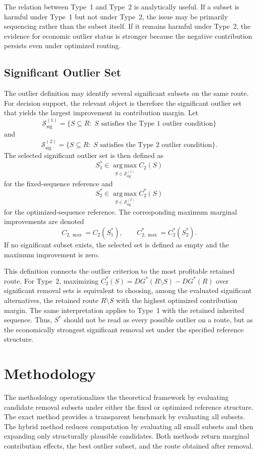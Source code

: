 \documentclass[preprint,12pt]{elsarticle}
\begin{document}
The relation between Type~1 and Type~2 is analytically useful. If a subset is harmful under Type~1 but not under Type~2, the issue may be primarily sequencing rather than the subset itself. If it remains harmful under Type~2, the evidence for economic outlier status is stronger because the negative contribution persists even under optimized routing.

\subsection{Significant Outlier Set}
\label{subsec:significant-outlier-set}

The outlier definition may identify several significant subsets on the same route. For decision support, the relevant object is therefore the significant outlier set that yields the largest improvement in contribution margin. Let
\[
\mathcal{S}_{\mathrm{sig}}^{(1)}
=
\{S\subseteq R:\; S \text{ satisfies the Type~1 outlier condition}\}
\]
and
\[
\mathcal{S}_{\mathrm{sig}}^{(2)}
=
\{S\subseteq R:\; S \text{ satisfies the Type~2 outlier condition}\}.
\]
The selected significant outlier set is then defined as
\[
S_1^* \in \operatorname*{arg\,max}_{S\in \mathcal{S}_{\mathrm{sig}}^{(1)}} C_2(S)
\]
for the fixed-sequence reference and
\[
S_2^* \in \operatorname*{arg\,max}_{S\in \mathcal{S}_{\mathrm{sig}}^{(2)}} C_2^*(S)
\]
for the optimized-sequence reference. The corresponding maximum marginal improvements are denoted
\[
C_{2,\max}=C_2(S_1^*),
\qquad
C_{2,\max}^*=C_2^*(S_2^*).
\]
If no significant subset exists, the selected set is defined as empty and the maximum improvement is zero.

This definition connects the outlier criterion to the most profitable retained route. For Type~2, maximizing $C_2^*(S)=DG^*(R\setminus S)-DG^*(R)$ over significant removal sets is equivalent to choosing, among the evaluated significant alternatives, the retained route $R\setminus S$ with the highest optimized contribution margin. The same interpretation applies to Type~1 with the retained inherited sequence. Thus, $S^*$ should not be read as every possible outlier on a route, but as the economically strongest significant removal set under the specified reference structure.

\section{Methodology}
\label{sec:methodology}

The methodology operationalizes the theoretical framework by evaluating candidate removal subsets under either the fixed or optimized reference structure. The exact method provides a transparent benchmark by evaluating all subsets. The hybrid method reduces computation by evaluating all small subsets and then expanding only structurally plausible candidates. Both methods return marginal contribution effects, the best outlier subset, and the route obtained after removal.
\end{document}
